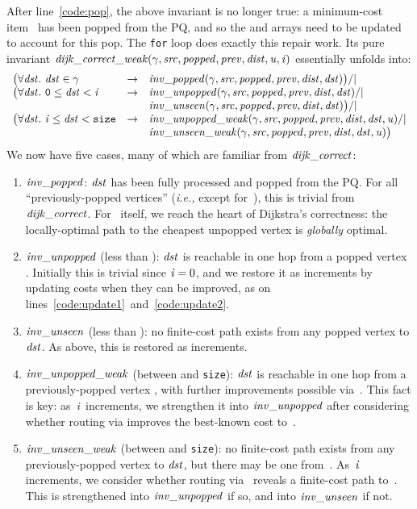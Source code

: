 After line~\ref{code:pop},
the above invariant is no longer true: a minimum-cost item~ has been
popped from the PQ, and so the  and  arrays need to be
updated to account for this pop. The \texttt{for} loop does exactly this repair work.
Its pure invariant
$\mathit{dijk\_correct\_weak}(\gamma, \mathit{src}, \mathit{popped}, \mathit{prev}, \mathit{dist}, \mathit{u}, \mathit{i})$ essentially unfolds into:
\[
\begin{array}{lcl}
\big(\forall \m{dst}.~\m{dst} \in \gamma & -> & \m{inv\_popped}(\gamma, \m{src}, \m{popped}, \m{prev}, \m{dist}, \m{dst})\big) /| \null \\
\big(\forall \m{dst}.~\texttt{0} \le \m{dst} < \m{i} & -> & \m{inv\_unpopped}(\gamma, \m{src}, \m{popped}, \m{prev}, \m{dist}, \m{dst}) /| \null \\
&& \m{inv\_unseen}(\gamma, \m{src}, \m{popped}, \m{prev}, \m{dist}, \m{dst}) \big) /| \null \\
\big(\forall \m{dst}.~\m{i} \le \m{dst} < \texttt{size} & -> & \m{inv\_unpopped\_weak}(\gamma, \m{src}, \m{popped}, \m{prev}, \m{dist}, \m{dst}, \m{u}) /| \null \\
&&\m{inv\_unseen\_weak}(\gamma, \m{src}, \m{popped}, \m{prev}, \m{dist}, \m{dst}, \m{u}) \big)
\end{array}
\]
We now have five cases, many of which are familiar from $\mathit{dijk\_correct}$:
\begin{enumerate}
\item $\mathit{inv\_popped}$: $\mathit{dst}$ has been fully processed and
popped from the PQ.  For all ``previously-popped vertices'' (\emph{i.e., }except for~),
this is trivial from $\mathit{dijk\_correct}$. For~ itself, we reach the heart of Dijkstra's correctness:
the locally-optimal path to the cheapest unpopped vertex is
\emph{globally} optimal.
\item $\mathit{inv\_unpopped}$ (less than ): $\mathit{dst}$ is reachable in
one hop from a popped vertex . Initially this is trivial since $\mathit{i}=0$, and we restore it as  increments by updating costs when they can be improved, as on lines~\ref{code:update1}~and~\ref{code:update2}.
\item $\mathit{inv\_unseen}$ (less than ): no finite-cost path exists from any popped vertex to $\mathit{dst}$. As above, this is restored as  increments.
\item $\mathit{inv\_unpopped\_weak}$ (between  and \texttt{size}):
$\mathit{dst}$ is reachable in one hop from a previously-popped vertex ,
with further improvements possible via~.
This fact is key: as~$\mathit{i}$ increments, we strengthen it
into $\mathit{inv\_unpopped}$ after considering whether routing via
 improves the best-known cost to~.
\item $\mathit{inv\_unseen\_weak}$ (between  and \texttt{size}):
no finite-cost path exists from any previously-popped vertex to
$\mathit{dst}$, but there may be one from~.
As~$\mathit{i}$ increments, we consider whether routing via~
reveals a finite-cost path to~.
This is strengthened into
$\mathit{inv\_unpopped}$ if so, and into
$\mathit{inv\_unseen}$ if not.
\end{enumerate}
